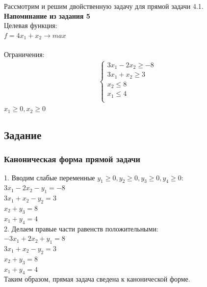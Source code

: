 \documentclass[14pt,a4paper,fleqn]{extarticle}
\begin{document}
Рассмотрим и решим двойственную задачу для прямой задачи 4.1.
\noindent\makebox[\linewidth]{\rule{\paperwidth}{0.4pt}}\\
\textbf{Напоминание из задания 5}\\
Целевая функция:\\
$f = 4x_1+x_2 \longrightarrow max$\\\\
Ограничения:
\begin{align*}
	\begin{cases}
		3x_1 - 2x_2 \geq -8\\
		3x_1 + x_2 \geq 3\\
		x_2 \leq 8\\
		x_1 \leq 4\\
	\end{cases}
\end{align*}
$x_1 \geq 0, x_2 \geq 0$

\subsection*{Задание}
\subsubsection*{Каноническая форма прямой задачи}
1. Вводим слабые переменные $y_1 \geq 0, y_2 \geq 0, y_3 \geq 0, y_4 \geq 0$:\\
$3x_1 - 2x_2 - y_1 = -8$\\
$3x_1 + x_2 - y_2 = 3$\\
$x_2 + y_3 = 8$\\
$x_1 + y_4 = 4$\\

2. Делаем правые части равенств положительными:\\
$-3x_1 + 2x_2 + y_1 = 8$\\
$3x_1 + x_2 - y_2 = 3$\\
$x_2 + y_3 = 8$\\
$x_1 + y_4 = 4$\\

Таким образом, прямая задача сведена к канонической форме.
\newpage
\end{document}
